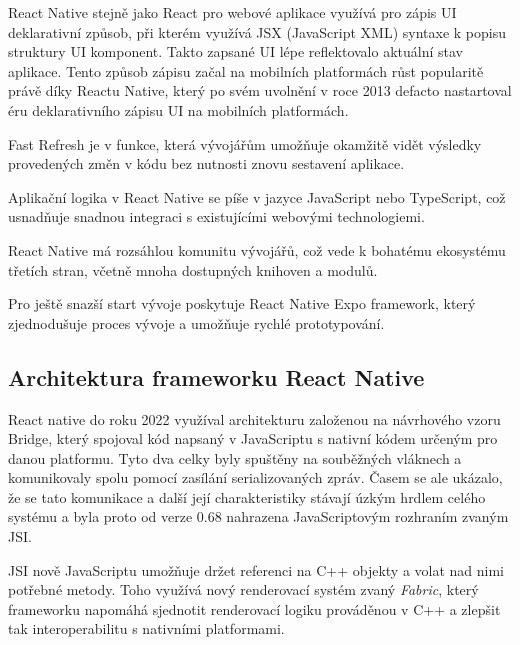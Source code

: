 React Native stejně jako React pro webové aplikace využívá pro zápis UI deklarativní způsob, 
při kterém využívá JSX (JavaScript XML) syntaxe k popisu struktury UI komponent. \cite{reactNativeJSX}
Takto zapsané UI lépe reflektovalo aktuální stav aplikace.
Tento způsob zápisu začal na mobilních platformách růst popularitě právě díky Reactu Native, který po svém uvolnění v roce 2013 
defacto nastartoval éru deklarativního zápisu UI na mobilních platformách. \cite{declarativeUIHistory}

Fast Refresh je v funkce, která vývojářům umožňuje okamžitě vidět výsledky provedených 
změn v kódu bez nutnosti znovu sestavení aplikace. \cite{reactNativeFastRefresh}

Aplikační logika v React Native se píše v jazyce JavaScript nebo TypeScript, 
což usnadňuje snadnou integraci s existujícími webovými technologiemi. \cite{reactNativeFundamentals}

React Native má rozsáhlou komunitu vývojářů, což vede k bohatému ekosystému 
třetích stran, včetně mnoha dostupných knihoven a modulů. \cite{reactNativeComunity}

Pro ještě snazší start vývoje poskytuje React Native Expo framework, který 
zjednodušuje proces vývoje a umožňuje rychlé prototypování. \cite{reactNativeExpo}

\subsection*{Architektura frameworku React Native}

React native do roku 2022 využíval architekturu založenou na návrhového vzoru Bridge, který spojoval kód napsaný v JavaScriptu s nativní kódem určeným pro danou platformu. 
Tyto dva celky byly spuštěny na souběžných vláknech a komunikovaly spolu pomocí zasílání serializovaných zpráv. Časem se ale ukázalo, že se tato komunikace
a další její charakteristiky stávají úzkým hrdlem celého systému a byla proto od verze 0.68 nahrazena JavaScriptovým rozhraním zvaným JSI. \cite{reactNativeAboutNewArch}

JSI nově JavaScriptu umožňuje držet referenci na C++ objekty a volat nad nimi potřebné metody. \cite{reactNativeAboutNewArch} Toho využívá nový renderovací systém zvaný \textit{Fabric}, který 
frameworku napomáhá sjednotit renderovací logiku prováděnou v C++ a zlepšit tak interoperabilitu s nativními platformami.

